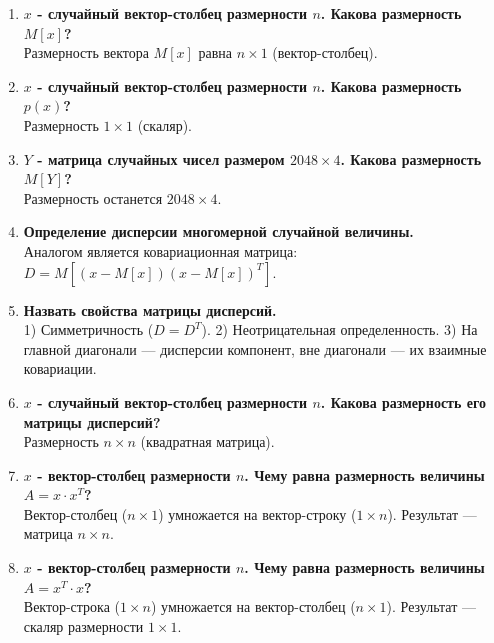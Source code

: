\documentclass[12pt, a4paper]{article}
\begin{document}
\begin{enumerate}
    \item \textbf{$x$ - случайный вектор-столбец размерности $n$. Какова размерность $M[x]$?} \\
    Размерность вектора $M[x]$ равна $n \times 1$ (вектор-столбец).

    \item \textbf{$x$ - случайный вектор-столбец размерности $n$. Какова размерность $p(x)$?} \\
    Размерность $1 \times 1$ (скаляр).

    \item \textbf{$Y$ - матрица случайных чисел размером $2048 \times 4$. Какова размерность $M[Y]$?} \\
    Размерность останется $2048 \times 4$.

    \item \textbf{Определение дисперсии многомерной случайной величины.} \\
    Аналогом является ковариационная матрица: $D = M[(x - M[x])(x - M[x])^T]$.

    \item \textbf{Назвать свойства матрицы дисперсий.} \\
    1) Симметричность ($D = D^T$). 2) Неотрицательная определенность. 3) На главной диагонали — дисперсии компонент, вне диагонали — их взаимные ковариации.

    \item \textbf{$x$ - случайный вектор-столбец размерности $n$. Какова размерность его матрицы дисперсий?} \\
    Размерность $n \times n$ (квадратная матрица).

    \item \textbf{$x$ - вектор-столбец размерности $n$. Чему равна размерность величины $A=x \cdot x^T$?} \\
    Вектор-столбец ($n \times 1$) умножается на вектор-строку ($1 \times n$). Результат — матрица $n \times n$.

    \item \textbf{$x$ - вектор-столбец размерности $n$. Чему равна размерность величины $A=x^T \cdot x$?} \\
    Вектор-строка ($1 \times n$) умножается на вектор-столбец ($n \times 1$). Результат — скаляр размерности $1 \times 1$.


\end{enumerate}
\end{document}
